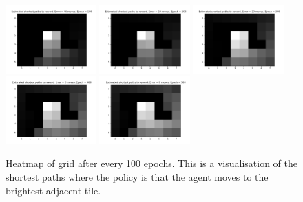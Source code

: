 \documentclass[10pt, a4paper]{article}
\begin{document}
\begin{figure}[H]
	\centering
	\includegraphics[width=0.31\textwidth]{fig/grid_shortest_paths_100.png}
	\includegraphics[width=0.31\textwidth]{fig/grid_shortest_paths_200.png}
	\includegraphics[width=0.31\textwidth]{fig/grid_shortest_paths_300.png}
	\includegraphics[width=0.31\textwidth]{fig/grid_shortest_paths_400.png}
	\includegraphics[width=0.31\textwidth]{fig/grid_shortest_paths_500.png}
	\caption{Heatmap of grid after every 100 epochs. This is a visualisation of the shortest paths where the policy is that the agent moves to the brightest adjacent tile.}
	\label{heatmap}
\end{figure}
\end{document}
